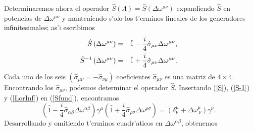 Determinaremos ahora el operador $\hat{S}(\Lambda) =\hat{S}%
\left( \Delta \omega^{\mu \nu }\right) $ expandiendo $\hat{S}$ en potencias
de $\Delta \omega^{\mu \nu }$ y manteniendo s'olo los t'erminos
lineales de los generadores infinitesimales; as'i escribimos 
\begin{eqnarray}
\hat{S}\left( \Delta \omega^{\mu \nu }\right) &=&\hat{1}-\frac{i}{4}\hat{%
\sigma}_{\mu \nu }\Delta \omega^{\mu \nu }, \label{S} \\
\hat{S}^{-1}\left( \Delta \omega^{\mu \nu }\right) &=&\hat{1}+\frac{i}{4}%
\hat{\sigma}_{\mu \nu }\Delta \omega^{\mu \nu }. \label{S-1}
\end{eqnarray}
Cada uno de los seis $\left( \hat{\sigma}_{\mu \nu }=-\hat{\sigma}_{\nu \mu
}\right) $ coeficientes $\hat{\sigma}_{\mu \nu }$ es una matriz de $4\times
4 $. Encontrando los $\hat{\sigma%
}_{\mu \nu }$, podemos determinar el operador $\hat{S}$. Insertando
(\ref{S}), (\ref{S-1}) y (\ref{LorInf}) en (\ref{Sfund}), encontramos 
\begin{equation}
\left( \hat{1}-\frac{i}{4}\hat{\sigma}_{\alpha \beta }\Delta
\omega^{\alpha \beta }\right) \gamma^\mu \left( \hat{1}+\frac{i}{4}%
\hat{\sigma}_{\rho \sigma }\Delta \omega^{\rho \sigma }\right) 
=\left( \delta^\mu_\nu +\Delta \omega^\mu_{\ \nu }\right) \gamma^{\nu }.
\end{equation}
Desarrollando y omitiendo t'erminos cuadr'aticos en
$\Delta\omega^{\alpha\beta}$, obtenemos  
